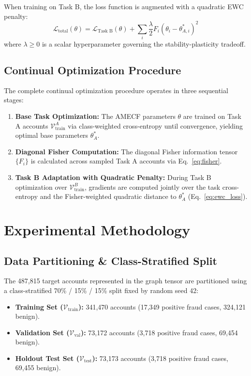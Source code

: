 \documentclass[conference]{IEEEtran}
\begin{document}
When training on Task B, the loss function is augmented with a quadratic EWC penalty:
\begin{equation}
    \mathcal{L}_{\text{total}}(\theta) = \mathcal{L}_{\text{Task B}}(\theta) + \sum_{i} \frac{\lambda}{2} F_i (\theta_i - \theta_{A, i}^*)^2
    \label{eq:ewc_loss}
\end{equation}
where $\lambda \ge 0$ is a scalar hyperparameter governing the stability-plasticity tradeoff.

\subsection{Continual Optimization Procedure}
The complete continual optimization procedure operates in three sequential stages:
\begin{enumerate}
    \item \textbf{Base Task Optimization:} The AMECF parameters $\theta$ are trained on Task A accounts $\mathcal{V}_{\text{train}}^A$ via class-weighted cross-entropy until convergence, yielding optimal base parameters $\theta_A^*$.
    \item \textbf{Diagonal Fisher Computation:} The diagonal Fisher information tensor $\{F_i\}$ is calculated across sampled Task A accounts via Eq.~\eqref{eq:fisher}.
    \item \textbf{Task B Adaptation with Quadratic Penalty:} During Task B optimization over $\mathcal{V}_{\text{train}}^B$, gradients are computed jointly over the task cross-entropy and the Fisher-weighted quadratic distance to $\theta_A^*$ (Eq.~\eqref{eq:ewc_loss}).
\end{enumerate}

\section{Experimental Methodology}
\label{sec:experiments}

\subsection{Data Partitioning \& Class-Stratified Split}
The 487,815 target accounts represented in the graph tensor are partitioned using a class-stratified 70\% / 15\% / 15\% split fixed by random seed 42:
\begin{itemize}
    \item \textbf{Training Set ($\mathcal{V}_{\text{train}}$):} 341,470 accounts (17,349 positive fraud cases, 324,121 benign).
    \item \textbf{Validation Set ($\mathcal{V}_{\text{val}}$):} 73,172 accounts (3,718 positive fraud cases, 69,454 benign).
    \item \textbf{Holdout Test Set ($\mathcal{V}_{\text{test}}$):} 73,173 accounts (3,718 positive fraud cases, 69,455 benign).
\end{itemize}
\end{document}
